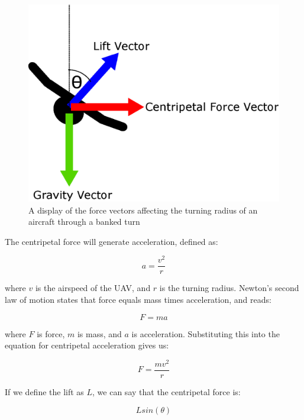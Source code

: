 \begin{figure}[htbp!] 
\centering    
\includegraphics[height=0.4\textheight]{BankedTurns}
\caption[The forces involved in banked turns]{A display of the force vectors affecting the turning radius of an aircraft through a banked turn}%
\label{fig:bankedTurns}
\end{figure}

The centripetal force will generate acceleration, defined as:

\begin{equation}
	a = \frac{v^2}{r}	
\end{equation}

where $v$ is the airspeed of the UAV, and $r$ is the turning radius. Newton's second law of motion states that force equals mass times acceleration, and reads:

\begin{equation}
	F = ma
\end{equation}

where $F$ is force, $m$ is mass, and $a$ is acceleration. Substituting this into the equation for centripetal acceleration gives us:

\begin{equation}
	F = \frac{mv^2}{r}	
\end{equation}

 If we define the lift as $L$, we can say that the centripetal force is:

\begin{equation}
	Lsin(\theta)
\end{equation}

